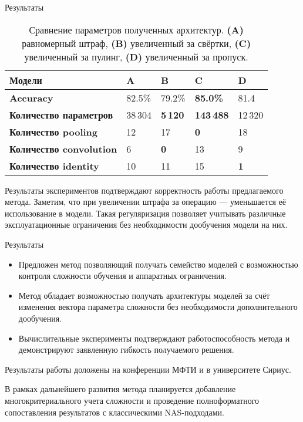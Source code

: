 \documentclass{beamer}
\begin{document}
\begin{frame}[t]{Результаты}
  \begin{table}[h!]
  
    \centering
    \small
    \begin{tabular}{b{4.5cm}|b{1.2cm}|m{1.2cm}|m{1.2cm}|m{1.2cm}||}
    \hline
     \textbf{Модели} & \textbf{A} & \textbf{B} & \textbf{C} & \textbf{D} \\
    \hline
    \hline
    \textbf{Accuracy} &  82.5\% & 79.2\% &  \textbf{85.0\%} & 81.4\\
    \hline
    \textbf{Количество параметров} & 38\,304 & \textbf{5\,120} & \textbf{143\,488} &12\,320 \\
    \hline
    \textbf{Количество pooling} & 12 & 17 & \textbf{0} &18\\
    \hline
    \textbf{Количество convolution} & 6 & \textbf{0} & 13& 9 \\
    \hline
    \textbf{Количество identity} & 10 & 11 & 15 & \textbf{1} \\
    \hline
    \end{tabular}
     \caption{Сравнение параметров полученных архитектур. \textbf{(A)} равномерный штраф, 
             \textbf{(B)} увеличенный за свёртки, 
             \textbf{(C)} увеличенный за пулинг, 
             \textbf{(D)} увеличенный за пропуск.}
  \end{table}

    Результаты экспериментов подтверждают корректность работы предлагаемого метода. Заметим, что при увеличении штрафа за операцию --- уменьшается её использование в модели. Такая регуляризация позволяет учитывать различные эксплуатационные ограничения без необходимости дообучения модели на них.
\end{frame}


\begin{frame}{Результаты}
\begin{itemize}
    \item Предложен метод позволяющий получать семейство моделей с возможностью контроля сложности обучения и аппаратных ограничения.
    \item Метод обладает возможностью получать архитектуры моделей за счёт изменения вектора параметра сложности без необходимости дополнительного дообучения.
    \item Вычислительные эксперименты подтверждают работоспособность метода и демонстрируют заявленную гибкость получаемого решения.
\end{itemize}

\vspace{10pt}
Результаты работы доложены на конференции МФТИ и в университете Сириус.

В рамках дальнейшего развития метода планируется добавление многокритериального учета сложности и проведение полноформатного сопоставления результатов с классическими NAS-подходами.

\end{frame}
\end{document}
